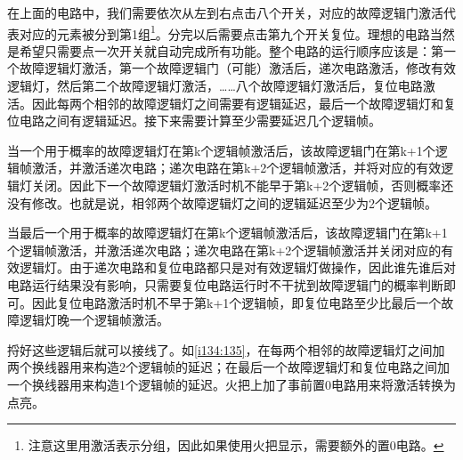 \begin{figure}[!ht]
\begin{center}
\qquad
{}
\end{center}
\caption{}
\label{i132:133}
\end{figure}

在上面的电路中，我们需要依次从左到右点击八个开关，对应的故障逻辑门激活代表对应的元素被分到第1组\footnote{注意这里用激活表示分组，因此如果使用火把显示，需要额外的置0电路。}。分完以后需要点击第九个开关复位。理想的电路当然是希望只需要点一次开关就自动完成所有功能。整个电路的运行顺序应该是：第一个故障逻辑灯激活，第一个故障逻辑门（可能）激活后，递次电路激活，修改有效逻辑灯，然后第二个故障逻辑灯激活，……八个故障逻辑灯激活后，复位电路激活。因此每两个相邻的故障逻辑灯之间需要有逻辑延迟，最后一个故障逻辑灯和复位电路之间有逻辑延迟。接下来需要计算至少需要延迟几个逻辑帧。

当一个用于概率的故障逻辑灯在第k个逻辑帧激活后，该故障逻辑门在第k+1个逻辑帧激活，并激活递次电路；递次电路在第k+2个逻辑帧激活，并将对应的有效逻辑灯关闭。因此下一个故障逻辑灯激活时机不能早于第k+2个逻辑帧，否则概率还没有修改。也就是说，相邻两个故障逻辑灯之间的逻辑延迟至少为2个逻辑帧。

当最后一个用于概率的故障逻辑灯在第k个逻辑帧激活后，该故障逻辑门在第k+1个逻辑帧激活，并激活递次电路；递次电路在第k+2个逻辑帧激活并关闭对应的有效逻辑灯。由于递次电路和复位电路都只是对有效逻辑灯做操作，因此谁先谁后对电路运行结果没有影响，只需要复位电路运行时不干扰到故障逻辑门的概率判断即可。因此复位电路激活时机不早于第k+1个逻辑帧，即复位电路至少比最后一个故障逻辑灯晚一个逻辑帧激活。

捋好这些逻辑后就可以接线了。如\autoref{i134:135}，在每两个相邻的故障逻辑灯之间加两个换线器用来构造2个逻辑帧的延迟；在最后一个故障逻辑灯和复位电路之间加一个换线器用来构造1个逻辑帧的延迟。火把上加了事前置0电路用来将激活转换为点亮。


